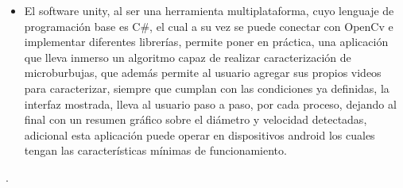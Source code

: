 \documentclass[12pt,twocolumn,a4paper]{article}
\begin{document}
\begin{itemize}
\item El software unity, al ser una herramienta multiplataforma, cuyo lenguaje de programación base es C\#, el cual a su vez se puede conectar con OpenCv e implementar diferentes librerías, permite poner en práctica, una aplicación que lleva inmerso un algoritmo capaz de realizar caracterización de microburbujas, que además permite al usuario agregar sus propios videos para caracterizar, siempre que cumplan con las condiciones ya definidas, la interfaz mostrada, lleva al usuario paso a paso, por cada proceso, dejando al final con un resumen gráfico sobre el diámetro y velocidad detectadas, adicional esta aplicación puede operar en dispositivos android los cuales tengan las características mínimas de funcionamiento.
\end{itemize}.



\end{document}
